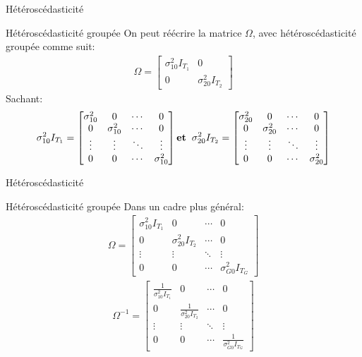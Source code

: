 \documentclass{beamer}
\begin{document}
\begin{frame}{Hétéroscédasticité}
\begin{block}{Hétéroscédasticité groupée}
On peut réécrire la matrice $\Omega$, avec hétéroscédasticité groupée comme suit:
\begin{align*}
\Omega=
\begin{bmatrix}
\sigma_{10}^2 I_{T_1} & 0\\ 
 0 & \sigma_{20}^2 I_{T_2}
\end{bmatrix}
\end{align*}
Sachant:
\begin{align*}
\sigma_{10}^2 I_{T_1}=\begin{bmatrix}
\sigma_{10}^2 & 0 & \cdots  & 0 \\ 
0 & \sigma_{10}^2  & \cdots & 0 \\ 
\vdots & \vdots & \ddots & \vdots \\ 
0 & 0 & \cdots & \sigma_{10}^2
\end{bmatrix} \textbf{et}\hspace{0.2cm} \sigma_{20}^2 I_{T_2}=\begin{bmatrix}
\sigma_{20}^2 & 0 & \cdots  & 0 \\ 
0 & \sigma_{20}^2  & \cdots & 0 \\ 
\vdots & \vdots & \ddots & \vdots \\ 
0 & 0 & \cdots & \sigma_{20}^2
\end{bmatrix}
\end{align*}
\end{block}
\end{frame}

\begin{frame}{Hétéroscédasticité}
\begin{block}{Hétéroscédasticité groupée}
Dans un cadre plus général:
\begin{align*}
\Omega= \begin{bmatrix} \sigma_{10}^2I_{T_1} & 0 & \cdots & 0 \\
0 & \sigma_{20}^2I_{T_2} & \cdots & 0 \\
\vdots & \vdots & \ddots & \vdots \\
0 & 0 & \cdots & \sigma_{G0}^2I_{T_G}
\end{bmatrix}
\end{align*}
\begin{align*}
\Omega^{-1}= \begin{bmatrix} \frac{1}{\sigma_{10}^2I_{T_1}} & 0 & \cdots & 0 \\
0 & \frac{1}{\sigma_{20}^2I_{T_2}} & \cdots & 0 \\
\vdots & \vdots & \ddots & \vdots \\
0 & 0 & \cdots & \frac{1}{\sigma_{G0}^2I_{T_G}}
\end{bmatrix}
\end{align*}
\end{block}
\end{frame}
\end{document}

